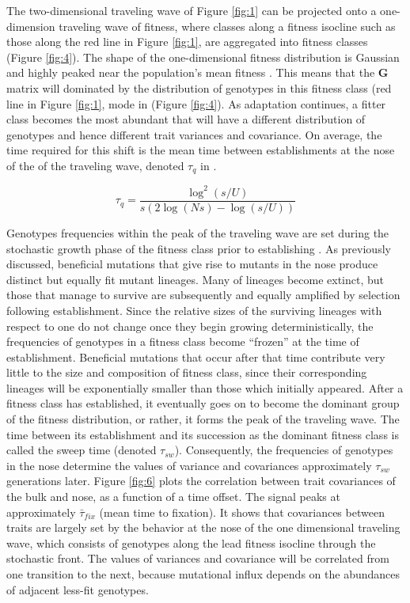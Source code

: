 \documentclass[9pt,twocolumn,twoside]{gsajnl}
\newcommand{\G}{\textbf{G }}
\begin{document}
The two-dimensional traveling wave of Figure \ref{fig:1} can be projected onto a one-dimension traveling wave of fitness, where classes along a fitness isocline such as those along the red line in Figure \ref{fig:1}, are aggregated into fitness classes (Figure \ref{fig:4}). The shape of the one-dimensional fitness distribution is Gaussian and highly peaked near the population's mean fitness \citep{desai2007beneficial}. This means that the \G matrix will dominated by the distribution of genotypes in this fitness class (red line in Figure \ref{fig:1}, mode in (Figure \ref{fig:4}). As adaptation continues, a fitter class becomes the most abundant that will have a different distribution of genotypes and hence different trait variances and covariance. On average, the time required for this shift is the mean time between establishments at the nose of the of the traveling wave, denoted $\tau_q$ in \citet{desai2007beneficial}.

\begin{equation}\label{eq:8}
\tau_q = \frac{\log^2(s/U)}{s(2\log(Ns)-\log(s/U))}
\end{equation}\par

Genotypes frequencies within the peak of the traveling wave are set during the stochastic growth phase of the fitness class prior to establishing \citep{Desai2013}.  As previously discussed, beneficial mutations that give rise to mutants in the nose produce distinct but equally fit mutant lineages. Many of lineages become extinct, but those that manage to survive are subsequently and equally amplified by selection following establishment. Since the relative sizes of the surviving lineages with respect to one do not change once they begin growing deterministically, the frequencies of genotypes in a fitness class become ``frozen'' at the time of establishment. Beneficial mutations that occur after that time contribute very little to the size and composition of fitness class, since their corresponding lineages will be exponentially smaller than those which initially appeared. After a fitness class has established, it eventually goes on to become the dominant group of the fitness distribution, or rather, it forms the peak of the traveling wave. The time between its establishment and its succession as the dominant fitness class is called the sweep time (denoted $\tau_{sw}$). Consequently, the frequencies of genotypes in the nose determine the values of variance and covariances approximately $\tau_{sw}$ generations later. Figure \ref{fig:6} plots the correlation between trait covariances of the bulk and nose, as a function of a time offset. The signal peaks at approximately $\bar{\tau}_{fix}$ (mean time to fixation). It shows that covariances between traits are largely set by the behavior at the nose of the one dimensional traveling wave, which consists of genotypes along the lead fitness isocline through the stochastic front.  The values of variances and covariance will be correlated from one transition to the next, because mutational influx depends on the abundances of adjacent less-fit genotypes.  
\end{document}
